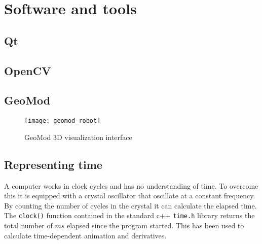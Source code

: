 \chapter{Software and tools}

\section{Qt}

\section{OpenCV}


\section{GeoMod}


\begin{figure}
 \centering 
 \texttt{[image: geomod\_robot]}
 \caption{GeoMod 3D visualization interface}
 \label{geomod_interface}
\end{figure}

\section{Representing time}

A computer works in clock cycles and has no understanding of time. To overcome this it is equipped with a crystal oscillator that oscillate at a constant frequency. By counting the number of cycles in the crystal it can calculate the elapsed time. The \texttt{clock()} function contained in the standard c++ \texttt{time.h} library returns the total number of $ms$ elapsed since the program started. This has been used to calculate time-dependent animation and derivatives.
